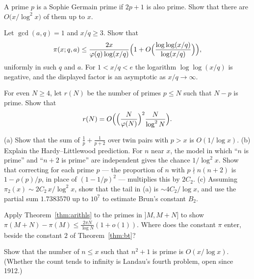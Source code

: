 \begin{exercise}[$\star$]\label{ex:sophie}
A prime $p$ is a Sophie Germain prime if $2p+1$ is also prime. Show that there are $O\bigl(x/\log^2x\bigr)$ of them up to $x$.
\end{exercise}

\begin{exercise}[$\star\star$]\label{ex:btap}
Let $\gcd(a,q)=1$ and $x/q\ge3$. Show that
\[
\pi(x;q,a)\le\frac{2x}{\varphi(q)\log(x/q)}\Bigl(1+O\Bigl(\frac{\log\log(x/q)}{\log(x/q)}\Bigr)\Bigr),
\]
uniformly in such $q$ and $a$. For $1<x/q<e$ the logarithm $\log\log(x/q)$ is negative, and the displayed factor is an asymptotic as $x/q\to\infty$.
\end{exercise}

\begin{exercise}[$\star\star$]\label{ex:goldbachup}
For even $N\ge4$, let $r(N)$ be the number of primes $p\le N$ such that $N-p$ is prime. Show that
\[
r(N)=O\Bigl(\Bigl(\frac N{\varphi(N)}\Bigr)^2\frac N{\log^2N}\Bigr).
\]
\end{exercise}

\begin{exercise}\label{ex:twinheuristic}
(a) Show that the sum of $\frac1p+\frac1{p+2}$ over twin pairs with $p>x$ is $O(1/\log x)$.
(b) Explain the Hardy--Littlewood prediction. For $n$ near $x$, the model in which ``$n$ is prime'' and ``$n+2$ is prime'' are independent gives the chance $1/\log^2x$. Show that correcting for each prime $p$ --- the proportion of $n$ with $p\nmid n(n+2)$ is $1-\rho(p)/p$, in place of $(1-1/p)^2$ --- multiplies this by $2C_2$.
(c) Assuming $\pi_2(x)\sim2C_2\,x/\log^2x$, show that the tail in (a) is $\sim4C_2/\log x$, and use the partial sum $1.7383570$ up to $10^7$ to estimate Brun's constant $B_2$.
\end{exercise}

\begin{exercise}[$\star$]\label{ex:lsprimes}
Apply Theorem~\ref{thm:arithls} to the primes in $]M,M+N]$ to show $\pi(M+N)-\pi(M)\le\frac{2\pi N}{\log N}(1+o(1))$. Where does the constant $\pi$ enter, beside the constant $2$ of Theorem~\ref{thm:bt}?
\end{exercise}

\begin{exercise}[$\star\star\star$]\label{ex:nsq1}
Show that the number of $n\le x$ such that $n^2+1$ is prime is $O(x/\log x)$. (Whether the count tends to infinity is Landau's fourth problem, open since 1912.)
\end{exercise}

